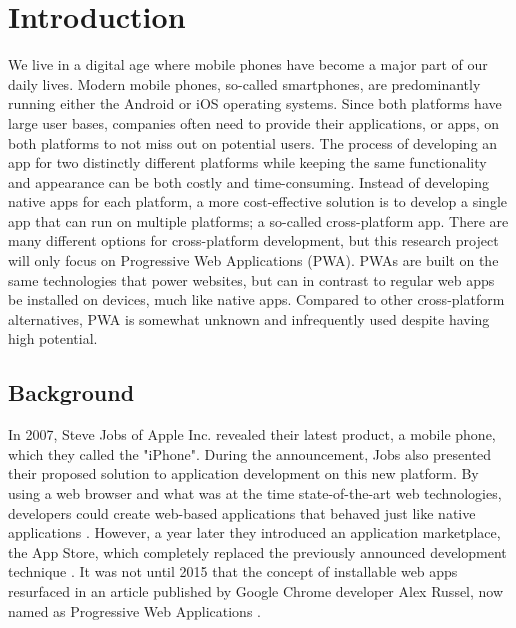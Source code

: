 \documentclass[a4paper,12pt]{article}
\begin{document}
\newpage
{}

\section{Introduction}
\label{Intro}
We live in a digital age where mobile phones have become a major part of our daily lives. Modern mobile phones, so-called smartphones, are predominantly running either the Android or iOS operating systems. Since both platforms have large user bases, companies often need to provide their applications, or apps, on both platforms to not miss out on potential users. The process of developing an app for two distinctly different platforms while keeping the same functionality and appearance can be both costly and time-consuming. Instead of developing native apps for each platform, a more cost-effective solution is to develop a single app that can run on multiple platforms; a so-called cross-platform app. There are many different options for cross-platform development, but this research project will only focus on Progressive Web Applications (PWA). PWAs are built on the same technologies that power websites, but can in contrast to regular web apps be installed on devices, much like native apps. Compared to other cross-platform alternatives, PWA is somewhat unknown and infrequently used despite having high potential.

\subsection{Background}
\label{Intro_background}
In 2007, Steve Jobs of Apple Inc. revealed their latest product, a mobile phone, which they called the "iPhone". During the announcement, Jobs also presented their proposed solution to application development on this new platform. By using a web browser and what was at the time state-of-the-art web technologies, developers could create web-based applications that behaved just like native applications \cite{stevejobs_pwa}. However, a year later they introduced an application marketplace, the App Store, which completely replaced the previously announced development technique \cite{stevejobs_appstore}. It was not until 2015 that the concept of installable web apps resurfaced in an article published by Google Chrome developer Alex Russel, now named as Progressive Web Applications \cite{russel_pwa}.
\end{document}
